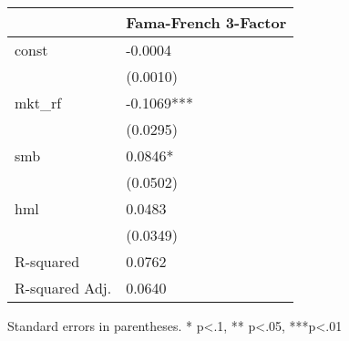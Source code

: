 \begin{table}
\caption{}
\label{}
\begin{center}
\begin{tabular}{ll}
\hline
               & Fama-French 3-Factor  \\
\hline
const          & -0.0004               \\
               & (0.0010)              \\
mkt\_rf        & -0.1069***            \\
               & (0.0295)              \\
smb            & 0.0846*               \\
               & (0.0502)              \\
hml            & 0.0483                \\
               & (0.0349)              \\
R-squared      & 0.0762                \\
R-squared Adj. & 0.0640                \\
\hline
\end{tabular}
\end{center}
\end{table}
\bigskip
Standard errors in parentheses. \newline 
* p<.1, ** p<.05, ***p<.01